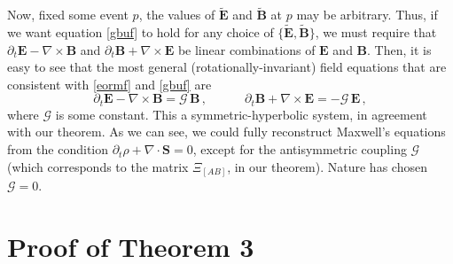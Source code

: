 \documentclass[aps,prl,singlecolumn,nofootinbib]{revtex4-2}
\newcommand{\spc}{\quad \quad \quad}
\theoremstyle{definition}
\theoremstyle{theorem}
\begin{document}
Now, fixed some event $p$, the values of $\tilde{\textbf{E}}$ and $\tilde{\textbf{B}}$ at $p$ may be arbitrary. Thus, if we want equation \eqref{gbuf} to hold for any choice of $\{ \tilde{\textbf{E}},\tilde{\textbf{B}} \}$, we must require that $\partial_t \textbf{E}-\nabla \times \textbf{B}$ and $\partial_t \textbf{B}+\nabla \times \textbf{E}$  be linear combinations of $\textbf{E}$ and $\textbf{B}$. Then, it is easy to see that the most general (rotationally-invariant) field equations that are consistent with \eqref{eormf} and \eqref{gbuf} are
\begin{equation}
\partial_t \textbf{E}-\nabla \times \textbf{B}= \mathcal{G}\, \textbf{B}  \, , \spc \partial_t \textbf{B}+\nabla \times \textbf{E}= -\mathcal{G} \, \textbf{E} \, ,
\end{equation}
where $\mathcal{G}$ is some constant. This a symmetric-hyperbolic system, in agreement with our theorem. As we can see, we could fully reconstruct Maxwell's equations from the condition $\partial_t \rho + \nabla \cdot \textbf{S}=0$, except for the antisymmetric coupling $\mathcal{G}$ (which corresponds to the matrix $\Xi_{[AB]}$, in our theorem). Nature has chosen $\mathcal{G}=0$.

\newpage

\section{Proof of Theorem 3}
\end{document}

